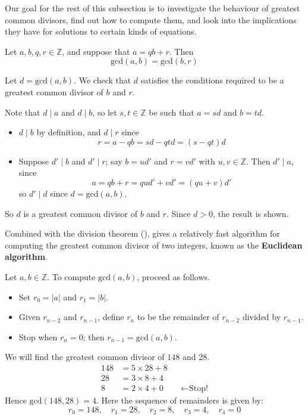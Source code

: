Our goal for the rest of this subsection is to investigate the behaviour of greatest common divisors, find out how to compute them, and look into the implications they have for solutions to certain kinds of equations.

\begin{theorem}
\label{thmGCDSubtractMultiple}
Let $a,b,q,r \in \mathbb{Z}$, and suppose that $a=qb+r$. Then
\[ \mathrm{gcd}(a,b) = \mathrm{gcd}(b,r) \]
\end{theorem}
\begin{cproof}
Let $d = \mathrm{gcd}(a,b)$. We check that $d$ satisfies the conditions required to be a greatest common divisor of $b$ and $r$.

Note that $d \mid a$ and $d \mid b$, so let $s,t \in \mathbb{Z}$ be such that $a=sd$ and $b=td$.
\begin{itemize}
\item $d \mid b$ by definition, and $d \mid r$ since
\[ r = a-qb = sd-qtd = (s-qt)d \]
\item Suppose $d' \mid b$ and $d' \mid r$; say $b = ud'$ and $r=vd'$ with $u,v \in \mathbb{Z}$. Then $d' \mid a$, since
\[ a = qb+r = qud'+vd' = (qu+v)d' \]
so $d' \mid d$ since $d = \mathrm{gcd}(a,b)$.
\end{itemize}
So $d$ is a greatest common divisor of $b$ and $r$. Since $d>0$, the result is shown.
\end{cproof}

Combined with the division theorem (),  gives a relatively fast algorithm for computing the greatest common divisor of two integers, known as the \textbf{Euclidean algorithm}.

\begin{strategy}
\label{strEuclideanAlgorithm}
Let $a,b \in \mathbb{Z}$. To compute $\mathrm{gcd}(a,b)$, proceed as follows.
\begin{itemize}
\item Set $r_0 = |a|$ and $r_1 = |b|$.
\item Given $r_{n-2}$ and $r_{n-1}$, define $r_n$ to be the remainder of $r_{n-2}$ divided by $r_{n-1}$.
\item Stop when $r_n = 0$; then $r_{n-1} = \mathrm{gcd}(a,b)$.
\end{itemize}
\end{strategy}

\begin{example}
We will find the greatest common divisor of $148$ and $28$.
\begin{align*}
148 &= 5 \times 28 + 8 && \\
28 &= 3 \times 8 + 4 && \\
8 &= 2 \times \boxed{4} + 0 && \leftarrow \text{Stop!}
\end{align*}
Hence $\mathrm{gcd}(148, 28) = 4$. Here the sequence of remainders is given by:
\[ r_0=148, \quad r_1 = 28, \quad r_2 = 8, \quad r_3 = 4, \quad r_4 = 0 \]
\end{example}

